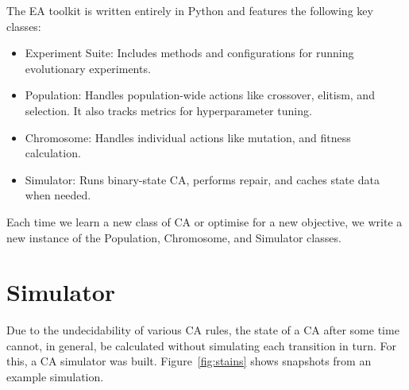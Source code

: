 The EA toolkit is written entirely in Python and features the following key classes:
\begin{itemize}
    \item Experiment Suite: Includes methods and configurations for running evolutionary experiments.
    \item Population: Handles population-wide actions like crossover, elitism, and selection. It also tracks metrics for hyperparameter tuning.
    \item Chromosome: Handles individual actions like mutation, and fitness calculation.
    \item Simulator: Runs binary-state CA, performs repair, and caches state data when needed.
\end{itemize}
Each time we learn a new class of CA or optimise for a new objective, we write a new instance of the Population,  Chromosome, and Simulator classes.

\section{Simulator} \label{subsec:simulator-1}
Due to the undecidability of various CA rules, the state of a CA after some time cannot, in general, be calculated without simulating each transition in turn. For this, a CA simulator was built. Figure~\ref{fig:stains} shows snapshots from an example simulation.\\

